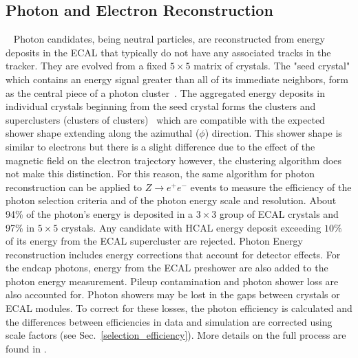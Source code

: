 
\subsection{Photon and Electron Reconstruction}~\label{sec:PhotonAndElectronRECO}
Photon candidates, being neutral particles, are reconstructed from energy deposits in the ECAL that typically do not have any associated tracks in the tracker. They are evolved from a fixed $5\times5$ matrix of crystals. The "seed crystal" which contains an energy signal greater than all of its immediate neighbors, form as the central piece of a photon cluster~\cite{CMS:2015myp}. The aggregated energy deposits in individual crystals beginning from the seed crystal forms the clusters and superclusters (clusters of clusters)~\cite{Khachatryan:2015iwa} which are compatible with the expected shower shape extending along the azimuthal ($\phi$) direction. This shower shape is similar to electrons but there is a slight difference due to the effect of the magnetic field on the electron trajectory however, the clustering algorithm does not make this distinction. For this reason, the same algorithm for photon reconstruction can be applied to $Z \rightarrow e^+e^-$ events to measure the efficiency of the photon selection criteria and of the photon energy scale and resolution. About 94\% of the photon's energy is deposited in a $3\times3$ group of ECAL crystals and 97\% in $5\times5$ crystals. Any candidate with HCAL energy deposit exceeding $10\%$ of its energy from the ECAL supercluster are rejected. Photon Energy reconstruction includes energy corrections that account for detector effects. For the endcap photons, energy from the ECAL preshower are also added to the photon energy measurement. Pileup contamination and photon shower loss are also accounted for. Photon showers may be lost in the gaps between crystals or ECAL modules. To correct for these losses, the photon efficiency is calculated and the differences between efficiencies in data and simulation are corrected using scale factors (see Sec.~\ref{selection_efficiency}). More details on the full process are found in \cite{Mukherjee:2021wzi}. 

